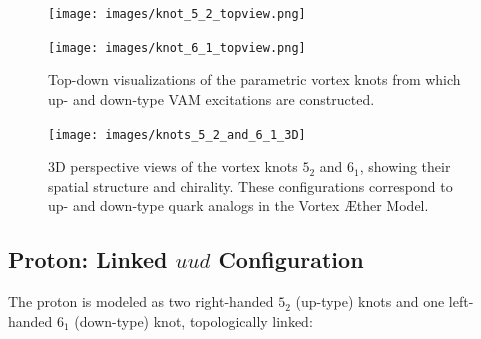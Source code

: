 \documentclass[12pt]{article}
\begin{document}
\begin{figure}[H]
\centering
\begin{minipage}{0.25\textwidth}
    \centering
             \texttt{[image: images/knot\_5\_2\_topview.png]}
\end{minipage}
\hspace{1em}
\begin{minipage}{0.25\textwidth}
    \centering
            \texttt{[image: images/knot\_6\_1\_topview.png]}
\end{minipage}
     \caption{Top-down visualizations of the parametric vortex knots from which up- and down-type VAM excitations are constructed.}
\end{figure}


\begin{figure}[H]
    \centering
    \texttt{[image: images/knots\_5\_2\_and\_6\_1\_3D]}
    \caption{3D perspective views of the vortex knots \(5_2\) and \(6_1\), showing their spatial structure and chirality. These configurations correspond to up- and down-type quark analogs in the Vortex \AE ther Model.}
\end{figure}


\subsection{Proton: Linked \(uud\) Configuration}

The proton is modeled as two right-handed \( 5_2 \) (up-type) knots and one left-handed \( 6_1 \) (down-type) knot, topologically linked:
\end{document}
